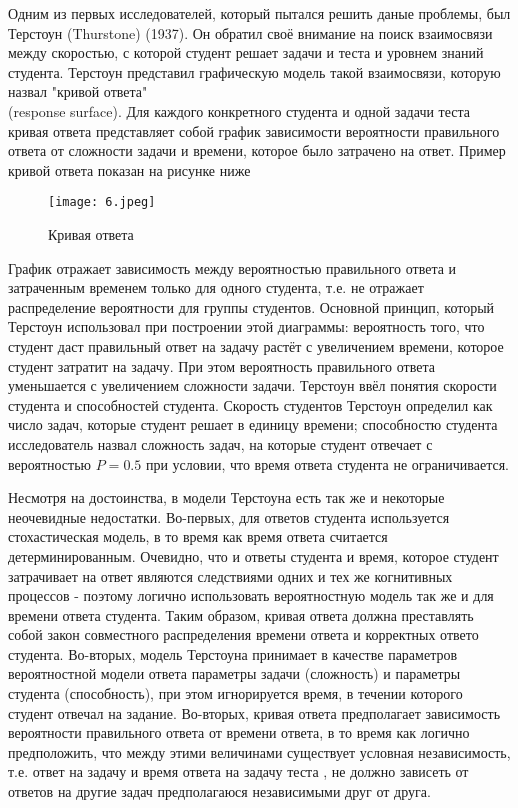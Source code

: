  Одним из первых исследователей, который пытался решить даные проблемы, был Терстоун (Thurstone) (1937). Он обратил своё внимание на поиск взаимосвязи между скоростью, с которой студент решает задачи и теста и уровнем знаний студента. Терстоун представил графическую модель такой взаимосвязи, которую назвал "кривой ответа" \\(response surface). Для каждого конкретного студента и одной задачи теста кривая ответа представляет собой график зависимости вероятности правильного ответа от сложности задачи и времени, которое было затрачено на ответ. Пример кривой ответа показан на рисунке ниже

\begin{figure}[ht!] 
\centering \texttt{[image: 6.jpeg]} 
\caption{Кривая ответа} 
\end{figure}

График отражает зависимость между вероятностью правильного ответа и затраченным временем только для одного студента, т.е. не отражает распределение вероятности для группы студентов. Основной принцип, который Терстоун использовал при построении этой диаграммы: вероятность того, что студент даст правильный ответ на задачу растёт с увеличением времени, которое студент затратит на задачу. При этом вероятность правиль\-ного ответа уменьшается с увеличением сложности задачи. Терстоун ввёл понятия скорости студента и способностей студента. Скорость студентов Терстоун определил как число задач, которые студент решает в единицу времени; способностю студента исследо\-ватель назвал сложность задач, на которые студент отвечает с вероятностью $P=0.5$ при условии, что время ответа студента не ограничивается.

Несмотря на достоинства, в модели Терстоуна есть так же и некоторые неочевидные недостатки. Во-первых, для ответов студента используется стохастическая модель, в то время как время ответа считается детерминированным. Очевидно, что и ответы студента и время, которое студент затрачивает на ответ являются следствиями одних и тех же когнитивных процессов - поэтому логично использовать вероятностную модель так же и для времени ответа студента. Таким образом, кривая ответа должна преставлять собой закон совместного распределения времени ответа и корректных ответо студента. Во-вторых, модель Терстоуна принимает в качестве параметров вероятностной модели ответа парамет\-ры задачи (сложность) и параметры студента (способность), при этом игнорируется время, в течении которого студент отвечал на задание. Во-вторых, кривая ответа предпола\-гает зависимость вероятности правильного ответа от времени ответа, в то время как логично предположить, что между этими величинами существует условная независимость, т.е. ответ на задачу и время ответа на задачу теста , не должно зависеть от ответов на другие задач предполагаюся независимыми друг от друга. 

